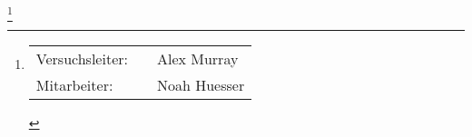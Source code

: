 \newcommand\blfootnote[1]{%
    \begingroup
    \renewcommand\thefootnote{}\footnote{#1}%
    \addtocounter{footnote}{-1}%
    \endgroup
}

\begin{titlepage}
    \maketitle
    \blfootnote{%
        \large
        \begin{tabular}{lcl}
            Versuchsleiter: & \hspace{5mm} & Alex Murray \\
            Mitarbeiter:    &              & Noah Huesser \\
        \end{tabular}
    }
\end{titlepage}

